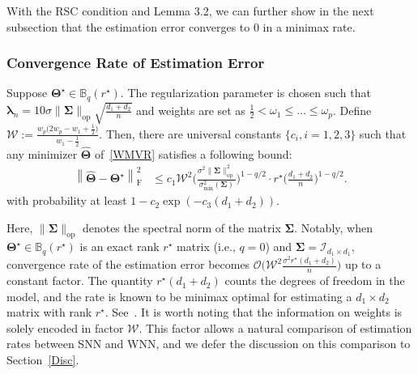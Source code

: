 \documentclass[alpha-refs]{wiley-article}
\begin{document}
With the RSC condition and Lemma 3.2, we can further show in the next subsection that the estimation error converges to $0$ in a minimax rate.

\subsubsection{Convergence Rate of Estimation Error}
\begin{theorem} \label{thm2}
Suppose $\boldsymbol{\Theta^{\star}}\in\mathbb{B}_{q}(r^{\star})$.
The regularization parameter is chosen such that $\boldsymbol{\lambda}_{n}=10\sigma\|\boldsymbol{\Sigma}\|_{\text{op}} \sqrt{\frac{d_{1}+d_{2}}{n}}$ and weights are set
as $\frac{1}{2} < \omega_{1} \leq \dots \leq \omega_{p}$.
Define $\mathcal{W}:=\frac{w_{p}\big(2w_{p}-w_{1}+\frac{1}{2}\big)}{w_{1}-\frac{1}{2}}$.
Then, there are universal constants $\{c_{i},i=1,2,3\}$ such that any minimizer $\boldsymbol{\widehat{\Theta}}$ of~\eqref{WMVR} satisfies a following bound:
\begin{align} \label{Rate}
    \left\| \widehat{\boldsymbol{\Theta}} - \boldsymbol{\Theta^{\star}} \right\|_{\text{F}}^{2}
    &\leq c_{1} \mathcal{W}^{2} \Bigg( \frac{\sigma^{2}\|\boldsymbol{\Sigma}\|_{\text{op}}^{2}}{\sigma_{\text{min}}^{2}(\boldsymbol{\Sigma})} \Bigg)^{1-q/2}
    \cdot r^{\star} \Bigg( \frac{d_{1}+d_{2}}{n} \Bigg)^{1-q/2}.
\end{align}
with probability at least $1-c_{2}\exp(-c_{3}(d_{1}+d_{2}))$.
\end{theorem}

Here, $\|\boldsymbol{\Sigma}\|_{\text{op}}$ denotes the spectral norm of the matrix $\boldsymbol{\Sigma}$.
Notably, when $\boldsymbol{\Theta^{\star}}\in\mathbb{B}_{q}(r^{\star})$ is an exact rank $r^{\star}$ matrix (i.e., $q=0$) and $\boldsymbol{\Sigma} = \mathcal{I}_{d_{1} \times d_{1}}$,
convergence rate of the estimation error becomes $\mathcal{O}\big( \mathcal{W}^{2} \frac{ \sigma^{2} r^{\star} (d_{1}+d_{2}) }{n} \big)$ up to a constant factor.
The quantity $r^{\star} (d_{1}+d_{2})$ counts the degrees of freedom in the model, and the rate is known to be minimax optimal for estimating a $d_{1} \times d_{2}$ matrix with rank $r^{\star}$.
See~\citet{negahban2011estimation,koltchinskii2011nuclear,rohde2011estimation}.
It is worth noting that the information on weights is solely encoded in factor $\mathcal{W}$.
This factor allows a natural comparison of estimation rates between SNN and WNN, and we defer the discussion on this comparison to Section~\ref{Disc}.
\end{document}
